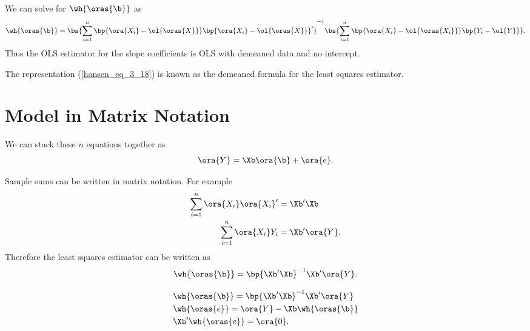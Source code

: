 We can solve for $\wh{\oras{\b}}$ as 
\begin{equation}
    \label{hansen_eq_3_18}
    \wh{\oras{\b}} = \bs{\sum_{i=1}^n \bp{\ora{X_i} - \ol{\oras{X}}} \bp{\ora{X_i} - \ol{\oras{X}}}^\prime}^{-1} \bs{\sum_{i=1}^n \bp{\ora{X_i} - \ol{\oras{X_i}}} \bp{Y_i - \ol{Y}}}.
\end{equation}
Thus the OLS estimator for the slope coefficients is OLS with demeaned data and no intercept.

The representation (\ref{hansen_eq_3_18}) is known as the demeaned formula for the least squares estimator.


\section{Model in Matrix Notation}

We can stack these $n$ equations together as
\begin{equation}
    \label{3.19}
    \ora{Y} = \Xb \ora{\b} + \ora{e}.
\end{equation}

Sample sums can be written in matrix notation. For example
\begin{equation}
    \notag
    \begin{aligned}
        \sum_{i=1}^n \ora{X_i} \ora{X_i}^\prime & = \Xb^\prime \Xb \\
        \sum_{i=1}^n \ora{X_i} Y_i & =  \Xb^\prime \ora{Y}.
    \end{aligned}
\end{equation}
Therefore the least squares estimator can be written as
\begin{equation}
    \notag
    \wh{\oras{\b}} = \bp{\Xb^\prime \Xb}^{-1} \Xb^\prime \ora{Y}.
\end{equation}

\begin{theorem}
    \begin{equation}
        \notag
        \begin{aligned}
            & \wh{\oras{\b}} = \bp{\Xb^\prime \Xb}^{-1} \Xb^\prime \ora{Y} \\
            & \wh{\oras{e}} = \ora{Y} - \Xb \wh{\oras{\b}} \\
            & \Xb^\prime \wh{\oras{e}} = \ora{0}.
        \end{aligned}
    \end{equation}
\end{theorem}

